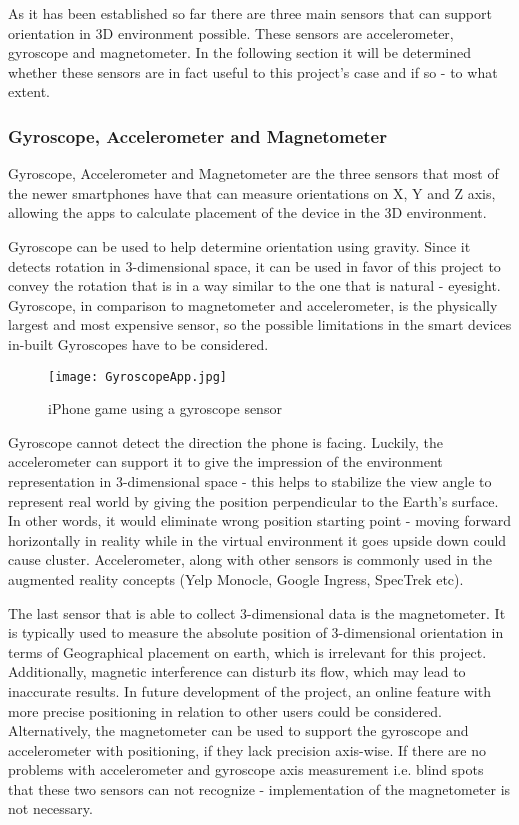 As it has been established so far there are three main sensors that can support orientation in 3D environment possible. These sensors are accelerometer, gyroscope and magnetometer. In the following section it will be determined whether these sensors are in fact useful to this project's case and if so - to what extent.

\subsubsection*{Gyroscope, Accelerometer and Magnetometer}
Gyroscope, Accelerometer and Magnetometer are the three sensors that most of the newer smartphones have \cite{AndroidDevelopers}  that can measure orientations on X, Y and Z axis, allowing the apps to calculate placement of the device in the 3D environment.

Gyroscope can be used to help determine orientation using gravity. Since it detects rotation in 3-dimensional space, it can be used in favor of this project to convey the rotation that is in a way similar to the one that is natural - eyesight. Gyroscope, in comparison to magnetometer and accelerometer, is the physically largest and most expensive sensor, so the possible limitations in the smart devices in-built Gyroscopes have to be considered.

\begin{figure}[H]
\centering
\texttt{[image: GyroscopeApp.jpg]}
\caption{iPhone game using a gyroscope sensor}
\end{figure}

Gyroscope cannot detect the direction the phone is facing. Luckily, the accelerometer can support it to give the impression of the environment representation in 3-dimensional space - this helps to stabilize the view angle to represent real world by giving the position perpendicular to the Earth's surface. In other words, it would eliminate wrong position starting point - moving forward horizontally in reality while in the virtual environment it goes upside down could cause cluster. Accelerometer, along with other sensors is commonly used in the augmented reality concepts (Yelp Monocle, Google Ingress, SpecTrek etc).

The last sensor that is able to collect 3-dimensional data is the magnetometer. It is typically used to measure the absolute position of 3-dimensional orientation in terms of Geographical placement on earth, which is irrelevant for this project.  Additionally, magnetic interference can disturb its flow, which may lead to inaccurate results. In future development of the project, an online feature with more precise positioning in relation to other users could be considered. Alternatively, the magnetometer can be used to support the gyroscope and accelerometer with positioning, if they lack precision axis-wise. If there are no problems with accelerometer and gyroscope axis measurement i.e. blind spots that these two sensors can not recognize - implementation of the magnetometer is not necessary. 


